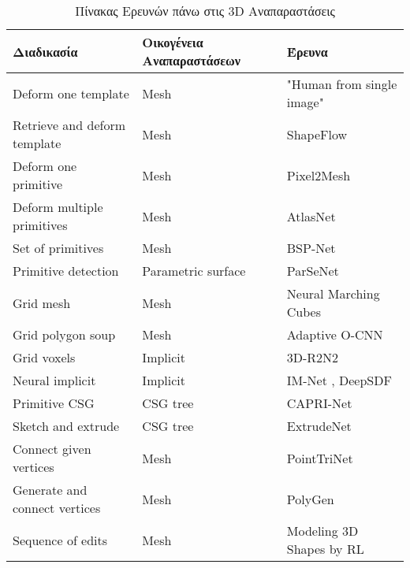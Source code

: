 \begin{table}[H]
    \centering
    \begin{tabular}{|P{3cm}|P{5cm}|P{7cm}|}
        \hline 
        Διαδικασία & Οικογένεια Αναπαραστάσεων &  Έρευνα \\
        \hline 
        Deform one template & Mesh & "Human from single image" \cite{Zheng2019DeepHuman} \\
        \hline 
        Retrieve and deform template & Mesh & ShapeFlow \cite{jiang2021shapeflow} \\
        \hline 
        Deform one primitive & Mesh & Pixel2Mesh \cite{wang2018pixel2mesh} \\
        \hline 
        Deform multiple primitives & Mesh & AtlasNet \cite{groueix2018atlasnet} \\
        \hline 
        Set of primitives & Mesh & BSP-Net \cite{chen2020bspnet} \\
        \hline 
        Primitive detection & Parametric surface & ParSeNet \cite{liu2015parsenet} \\
        \hline 
        Grid mesh & Mesh & Neural Marching Cubes \cite{Chen_2021} \\
        \hline 
        Grid polygon soup & Mesh & Adaptive O-CNN \cite{Wang_2018} \\
        \hline 
        Grid voxels & Implicit & 3D-R2N2 \cite{choy20163dr2n2} \\
        \hline 
        Neural implicit & Implicit & IM-Net \cite{Chen_2019_CVPR}, DeepSDF \cite{park2019deepsdf} \\
        \hline 
        Primitive CSG & CSG tree & CAPRI-Net \cite{yu2021caprinet} \\
        \hline 
        Sketch and extrude & CSG tree & ExtrudeNet \cite{ren2022extrudenet} \\
        \hline 
        Connect given vertices & Mesh & PointTriNet \cite{Sharp2020PointTriNetLT} \\
        \hline 
        Generate and connect vertices & Mesh & PolyGen \cite{nash2020polygen} \\
        \hline 
        Sequence of edits & Mesh & Modeling 3D Shapes by RL \cite{lin2020modeling} \\
        \hline
    \end{tabular}
    \caption{Πίνακας Ερευνών πάνω στις 3D Αναπαραστάσεις \cite{chen2023review}}
    \label{tab:3dreconmethods}
\end{table}


